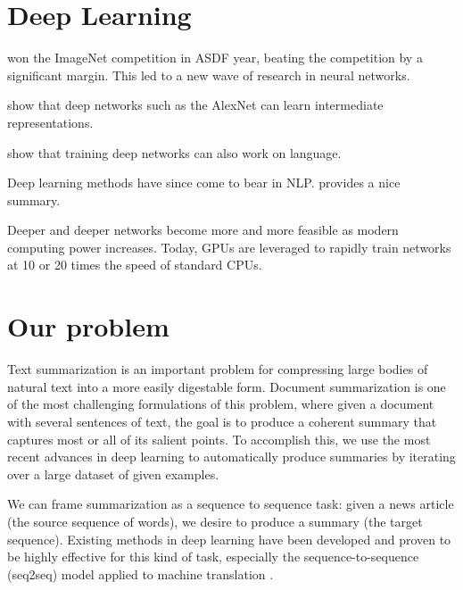 \documentclass[11pt]{report}
\begin{document}
\section{Deep Learning}


\cite{Krizhevsky2012} won the ImageNet competition in ASDF year, beating the competition by a significant margin. This led to a new wave of research in neural networks.

\cite{Zeiler2014} show that deep networks such as the AlexNet can learn intermediate representations.


\cite{mikolov2013word2vec} show that training deep networks can also work on language.  %


Deep learning methods have since come to bear in NLP. \cite{goldberg2015primer} provides a nice summary. %

Deeper and deeper networks become more and more feasible as modern computing power increases. Today, GPUs are leveraged to rapidly train networks at 10 or 20 times the speed of standard CPUs.


\section{Our problem}

Text summarization is an important problem for compressing large bodies of natural text into a more easily digestable form. Document summarization is one of the most challenging formulations of this problem, where given a document with several sentences of text, the goal is to produce a coherent summary that captures most or all of its salient points. To accomplish this, we use the most recent advances in deep learning to automatically produce summaries by iterating over a large dataset of given examples.

We can frame summarization as a sequence to sequence task: given a news article (the source sequence of words), we desire to produce a summary (the target sequence). Existing methods in deep learning have been developed and proven to be highly effective for this kind of task, especially the sequence-to-sequence (seq2seq) model applied to machine translation \citep{sutskever2014sequence, bahdanau2014neural}.
\end{document}
